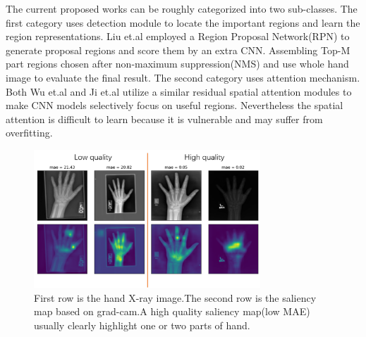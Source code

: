 \documentclass{article}
\begin{document}
The current proposed works can be roughly categorized into two sub-classes. The first category uses detection module to locate the important regions and learn the region representations. Liu et.al\cite{liu2019extract} employed a Region Proposal Network(RPN) to generate proposal regions and score them by an extra CNN. Assembling Top-M part regions chosen after non-maximum suppression(NMS) and use whole hand image to evaluate the final result. The second category uses attention mechanism. Both Wu et.al\cite{wu2019residual} and Ji et.al \cite{ji2019prsnet} utilize a similar residual spatial attention modules to make CNN models selectively focus on useful regions. Nevertheless the spatial attention is difficult to learn because it is vulnerable and may suffer from overfitting.

\begin{figure}[htb]

\begin{minipage}[b]{1.0\linewidth}
  \centering
  \centerline{\includegraphics[width=8.5cm]{cam.png}}
\end{minipage}
%
%
\caption{First row is the hand X-ray image.The second row is the saliency map based on grad-cam.A high quality saliency map(low MAE) usually clearly highlight one or two parts of hand.}
\label{fig:res}
%
\end{figure}
\end{document}
